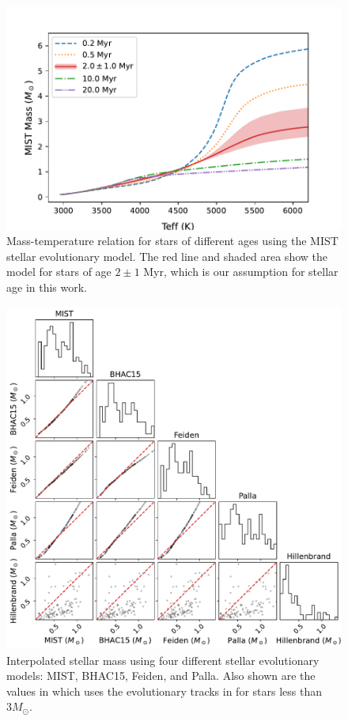 \documentclass[12pt]{ucsddissertation}
\begin{document}
\begin{CJK*}{UTF8}{gbsn}
\begin{figure}[htb!]
    \centering
    \includegraphics[width=\linewidth]{figures/chapter1/MIST_Evolutionary_Models.pdf}
    \caption[Mass-temperature relation in MIST model]{Mass-temperature relation for stars of different ages using the MIST stellar evolutionary model. The red line and shaded area show the model for stars of age $2\pm1$ Myr, which is our assumption for stellar age in this work.}
    \label{fig:mist model}
\end{figure}

\begin{figure}[htb!]
    \centering
    \includegraphics[width=\linewidth]{figures/chapter1/mass_comparison.pdf}
    \caption[Comparison of interpolated stellar mass with different stellar evolutionary models]{Interpolated stellar mass using four different stellar evolutionary models: MIST, BHAC15, Feiden, and Palla.  Also shown are the values in \citet{Hillenbrand-1997} which uses the evolutionary tracks in \citet{D'Antona-1994} for stars less than $3 M_\odot$.}
    \label{fig:mass comparison}
\end{figure}


\end{CJK*}
\end{document}
